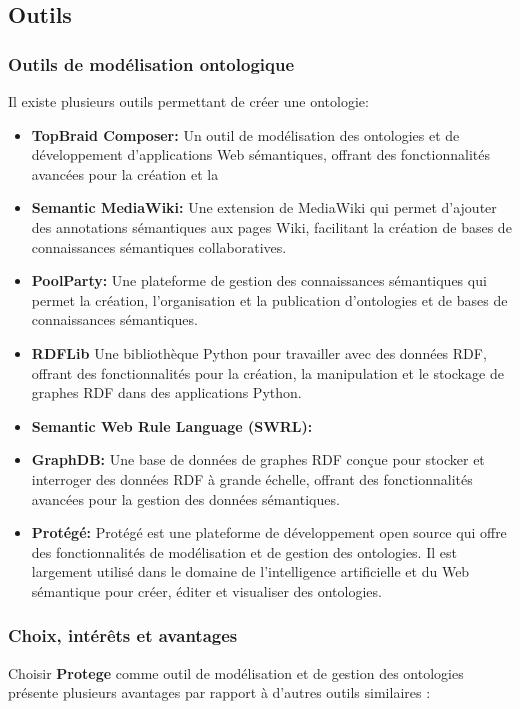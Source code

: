 \documentclass{article}
\begin{document}
	\subsection{Outils}
	\subsubsection{Outils de modélisation ontologique}
	Il existe plusieurs outils permettant de créer une ontologie:
	
	\begin{itemize}
		\item \textbf{TopBraid Composer: } Un outil de modélisation des ontologies et de développement d'applications Web sémantiques, offrant des fonctionnalités avancées pour la création et la 
		\item \textbf{Semantic MediaWiki:} Une extension de MediaWiki qui permet d'ajouter des annotations sémantiques aux pages Wiki, facilitant la création de bases de connaissances sémantiques collaboratives.
		\item \textbf{PoolParty:} Une plateforme de gestion des connaissances sémantiques qui permet la création, l'organisation et la publication d'ontologies et de bases de connaissances sémantiques.
		\item \textbf{RDFLib} Une bibliothèque Python pour travailler avec des données RDF, offrant des fonctionnalités pour la création, la manipulation et le stockage de graphes RDF dans des applications Python.
		\item \textbf{Semantic Web Rule Language (SWRL):}
		\item \textbf{GraphDB:} Une base de données de graphes RDF conçue pour stocker et interroger des données RDF à grande échelle, offrant des fonctionnalités avancées pour la gestion des données sémantiques.
		\item \textbf{Protégé:} Protégé est une plateforme de développement open source qui offre des fonctionnalités de modélisation et de gestion des ontologies. Il est largement utilisé dans le domaine de l'intelligence artificielle et du Web sémantique pour créer, éditer et visualiser des ontologies.
	\end{itemize}


	\subsubsection{Choix, intérêts et avantages}
		Choisir \textbf{Protege} comme outil de modélisation et de gestion des ontologies présente plusieurs avantages par rapport à d'autres outils similaires :
		
\end{document}
